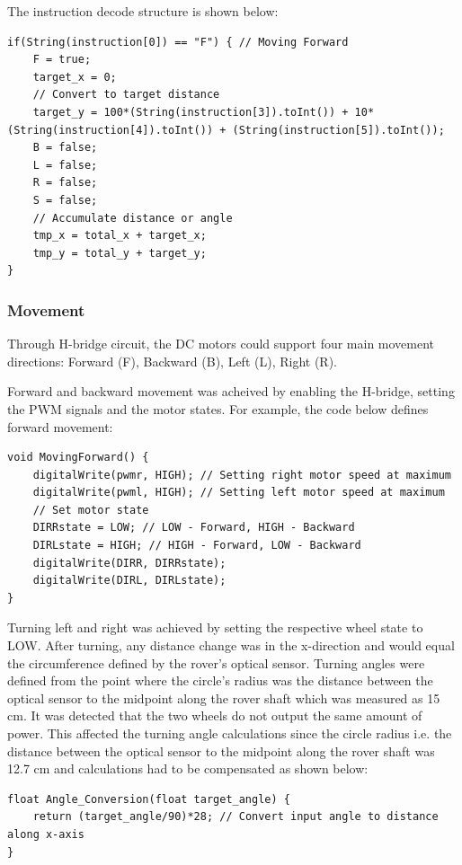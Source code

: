 \documentclass[11pt, a4paper]{article}
\begin{document}
The instruction decode structure is shown below:
\begin{lstlisting}
if(String(instruction[0]) == "F") { // Moving Forward
    F = true;
    target_x = 0;
    // Convert to target distance
    target_y = 100*(String(instruction[3]).toInt()) + 10*(String(instruction[4]).toInt()) + (String(instruction[5]).toInt()); 
    B = false;
    L = false;
    R = false;
    S = false;
    // Accumulate distance or angle
    tmp_x = total_x + target_x;
    tmp_y = total_y + target_y;
}
\end{lstlisting}

\subsubsection{Movement}

Through H-bridge circuit, the DC motors could support four main movement directions: Forward (F), Backward (B), Left (L), Right (R). 

Forward and backward movement was acheived by enabling the H-bridge, setting the PWM signals and the motor states. For example, the code below defines forward movement: 

\begin{lstlisting}
void MovingForward() {
    digitalWrite(pwmr, HIGH); // Setting right motor speed at maximum 
    digitalWrite(pwml, HIGH); // Setting left motor speed at maximum 
    // Set motor state 
    DIRRstate = LOW; // LOW - Forward, HIGH - Backward
    DIRLstate = HIGH; // HIGH - Forward, LOW - Backward
    digitalWrite(DIRR, DIRRstate); 
    digitalWrite(DIRL, DIRLstate); 
} 
\end{lstlisting}

Turning left and right was achieved by setting the respective wheel state to LOW. After turning, any distance change was in the x-direction and would equal the circumference defined by the rover's optical sensor. Turning angles were defined from the point where the circle's radius was the distance between the optical sensor to the midpoint along the rover shaft which was measured as 15 cm. It was detected that the two wheels do not output the same amount of power. This affected the turning angle calculations since the circle radius i.e. the distance between the optical sensor to the midpoint along the rover shaft was 12.7 cm and calculations had to be compensated as shown below:

\begin{lstlisting}
float Angle_Conversion(float target_angle) {
    return (target_angle/90)*28; // Convert input angle to distance along x-axis
} 
\end{lstlisting}
\end{document}
